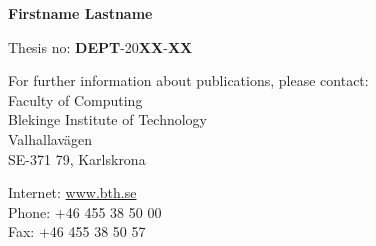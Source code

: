 {
	\setlength{\parindent}{0pt}
	\pagestyle{empty}
	\begin{titlepage}
		\par\vskip 2cm

		\begin{center}
			\printtitle
		
			\vfill
		
			\begin{LARGE}
				\textbf{Firstname Lastname}
			\end{LARGE}

			\vskip 2cm %
		\end{center}
	\end{titlepage}

	\mbox{}\newpage
	\setcounter{page}{1}

	\par\vskip 2cm
	\begin{center}
		\printtitle
	\end{center}

	\clearpage
	\par\vskip 2cm
	\begin{center}
		Thesis no: \textbf{DEPT}-20\textbf{XX}-\textbf{XX}
		
		\par\vspace {2cm}
		
		\bthlogo{4cm}
		
		\par\vspace {2cm}

		For further information about publications, please contact:\\[2ex]
		Faculty of Computing\\
		Blekinge Institute of Technology\\
		Valhallavägen\\
		SE-371 79, Karlskrona

		\par\vspace{0.5cm} %

		Internet: \href{http://www.bth.se}{www.bth.se}\\
		Phone: +46 455 38 50 00\\
		Fax: +46 455 38 50 57
	\end{center}

}
